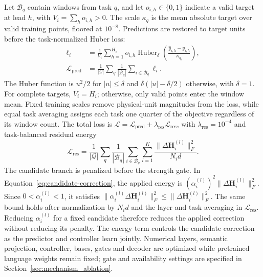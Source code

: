 \documentclass[journal]{IEEEtran}
\begin{document}
Let $\mathcal B_q$ contain windows from task $q$, and let $o_{i,h}\in\{0,1\}$ indicate a valid target at lead $h$, with $V_i=\sum_h o_{i,h}>0$. The scale $\kappa_q$ is the mean absolute target over valid training points, floored at $10^{-8}$. Predictions are restored to target units before the task-normalized Huber loss:
\begin{equation}
\label{eq:prediction-objective}
\begin{aligned}
\ell_i&=\frac{1}{V_i}\sum_{h=1}^{H_i}o_{i,h}
\operatorname{Huber}_{\delta}\!\left(
\frac{\hat y_{i,h}-y_{i,h}}{\kappa_{q_i}}\right),\\
\mathcal L_{\mathrm{pred}}&=\frac{1}{|\mathcal Q|}\sum_q
\frac{1}{|\mathcal B_q|}\sum_{i\in\mathcal B_q}\ell_i.
\end{aligned}
\end{equation}
The Huber function is $u^2/2$ for $|u|\leq\delta$ and $\delta(|u|-\delta/2)$ otherwise, with $\delta=1$. For complete targets, $V_i=H_i$; otherwise, only valid points enter the window mean. Fixed training scales remove physical-unit magnitudes from the loss, while equal task averaging assigns each task one quarter of the objective regardless of its window count. The total loss is $\mathcal L=\mathcal L_{\mathrm{pred}}+\lambda_{\mathrm{res}}\mathcal L_{\mathrm{res}}$, with $\lambda_{\mathrm{res}}=10^{-4}$ and task-balanced residual energy
\begin{equation}
\label{eq:residual-energy}
\mathcal L_{\mathrm{res}}=\frac{1}{|\mathcal Q|}\sum_q\frac{1}{|\mathcal B_q|}
\sum_{i\in\mathcal B_q}\sum_{l=1}^{K}
\frac{\|\Delta\mathbf H_i^{(l)}\|_F^2}{N_i d}.
\end{equation}
The candidate branch is penalized before the strength gate. In Equation~\eqref{eq:candidate-correction}, the applied energy is $(\alpha_i^{(l)})^2\|\Delta\mathbf H_i^{(l)}\|_F^2$. Since $0<\alpha_i^{(l)}<1$, it satisfies $\|\alpha_i^{(l)}\Delta\mathbf H_i^{(l)}\|_F^2\leq\|\Delta\mathbf H_i^{(l)}\|_F^2$. The same bound holds after normalization by $N_i d$ and the layer and task averaging in $\mathcal L_{\mathrm{res}}$. Reducing $\alpha_i^{(l)}$ for a fixed candidate therefore reduces the applied correction without reducing its penalty. The energy term controls the candidate correction as the predictor and controller learn jointly. Numerical layers, semantic projection, controller, bases, gates and decoder are optimized while pretrained language weights remain fixed; gate and availability settings are specified in Section~\ref{sec:mechanism_ablation}.
\end{document}
